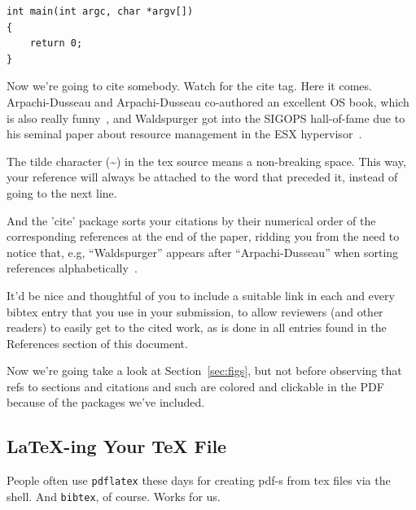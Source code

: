 \documentclass[letterpaper,twocolumn,10pt]{article}
\begin{document}
\begin{verbatim}
int main(int argc, char *argv[]) 
{
    return 0;
}
\end{verbatim}

Now we're going to cite somebody. Watch for the cite tag. Here it
comes. Arpachi-Dusseau and Arpachi-Dusseau co-authored an excellent OS
book, which is also really funny~\cite{arpachiDusseau18:osbook}, and
Waldspurger got into the SIGOPS hall-of-fame due to his seminal paper
about resource management in the ESX hypervisor~\cite{waldspurger02}.

The tilde character (\~{}) in the tex source means a non-breaking
space. This way, your reference will always be attached to the word
that preceded it, instead of going to the next line.

And the 'cite' package sorts your citations by their numerical order
of the corresponding references at the end of the paper, ridding you
from the need to notice that, e.g, ``Waldspurger'' appears after
``Arpachi-Dusseau'' when sorting references
alphabetically~\cite{waldspurger02,arpachiDusseau18:osbook}. 

It'd be nice and thoughtful of you to include a suitable link in each
and every bibtex entry that you use in your submission, to allow
reviewers (and other readers) to easily get to the cited work, as is
done in all entries found in the References section of this document.

Now we're going take a look at Section~\ref{sec:figs}, but not before
observing that refs to sections and citations and such are colored and
clickable in the PDF because of the packages we've included.

\subsection{LaTeX-ing Your TeX File}

People often use \texttt{pdflatex} these days for creating pdf-s from
tex files via the shell. And \texttt{bibtex}, of course. Works for us.




\end{document}
